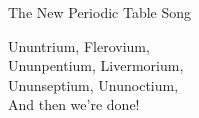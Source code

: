 \begin{song}{The New Periodic Table Song}
  \begin{SBVerse}
    Ununtrium, Flerovium,\\
    Ununpentium, Livermorium,\\
    Ununseptium, Ununoctium,\\
    And then we're done!
  \end{SBVerse}
\end{song}